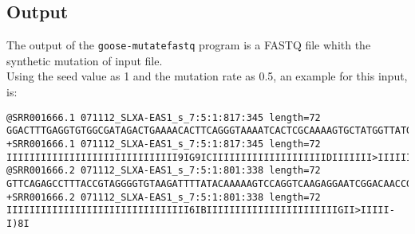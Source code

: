 \subsection*{Output}
The output of the \texttt{goose-mutatefastq} program is a FASTQ file whith the synthetic mutation of input file.\\
Using the seed value as 1 and the mutation rate as 0.5, an example for this input, is: 
\begin{lstlisting}
@SRR001666.1 071112_SLXA-EAS1_s_7:5:1:817:345 length=72
GGACTTTGAGGTGTGGCGATAGACTGAAAACACTTCAGGGTAAAATCACTCGCAAAAGTGCTATGGTTATGG
+SRR001666.1 071112_SLXA-EAS1_s_7:5:1:817:345 length=72
IIIIIIIIIIIIIIIIIIIIIIIIIIIIII9IG9ICIIIIIIIIIIIIIIIIIIIIDIIIIIII>IIIIII/
@SRR001666.2 071112_SLXA-EAS1_s_7:5:1:801:338 length=72
GTTCAGAGCCTTTACCGTAGGGGTGTAAGATTTTATACAAAAAGTCCAGGTCAAGAGGAATCGGACAACCGA
+SRR001666.2 071112_SLXA-EAS1_s_7:5:1:801:338 length=72
IIIIIIIIIIIIIIIIIIIIIIIIIIIIIIII6IBIIIIIIIIIIIIIIIIIIIIIIIGII>IIIII-I)8I
\end{lstlisting}
